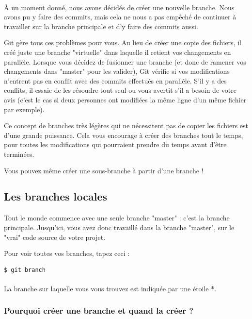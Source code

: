 \documentclass[french, a4paper, 12pt, titlepage]{article}
\begin{document}
\paragraph{}À un moment donné, nous avons décidés de créer une nouvelle branche. Nous avons pu y faire des commits, mais cela ne nous a pas empêché de continuer à travailler sur la branche principale et d’y faire des commits aussi.

Git gère tous ces problèmes pour vous. Au lieu de créer une copie des fichiers, il créé juste une branche "virtuelle" dans laquelle il retient vos changements en parallèle. Lorsque vous décidez de fusionner une branche (et donc de ramener vos changements dans "master" pour les valider), Git vérifie si vos modifications n’entrent pas en conflit avec des commits effectués en parallèle. S’il y a des conflits, il essaie de les résoudre tout seul ou vous avertit s’il a besoin de votre avis (c’est le cas si deux personnes ont modifiées la même ligne d’un même fichier par exemple).

Ce concept de branches très légères qui ne nécessitent pas de copier les fichiers est d’une grande puissance. Cela vous encourage à créer des branches tout le temps, pour toutes les modifications qui pourraient prendre du temps avant d’être terminées.

Vous pouvez même créer une sous-branche à partir d’une branche !


\subsection{Les branches locales}
\paragraph{}Tout le monde commence avec une seule branche "master" : c’est la branche principale. Jusqu’ici, vous avez donc travaillé dans la branche "master", sur le "vrai" code source de votre projet.

Pour voir toutes vos branches, tapez ceci :
\begin{lstlisting}
$ git branch
\end{lstlisting}

\paragraph{}La branche sur laquelle vous vous trouvez est indiquée par une étoile *.

\subsubsection{Pourquoi créer une branche et quand la créer ?}
\end{document}
